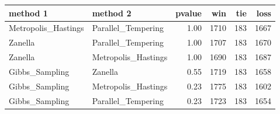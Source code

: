 \begin{table}[ht]
\centering
\begin{tabular}{llrrrr}
  \hline
method 1 & method 2 & pvalue & win & tie & loss \\ 
  \hline
Metropolis\_Hastings & Parallel\_Tempering & 1.00 & 1710 & 183 & 1667 \\ 
  Zanella & Parallel\_Tempering & 1.00 & 1707 & 183 & 1670 \\ 
  Zanella & Metropolis\_Hastings & 1.00 & 1690 & 183 & 1687 \\ 
  Gibbs\_Sampling & Zanella & 0.55 & 1719 & 183 & 1658 \\ 
  Gibbs\_Sampling & Metropolis\_Hastings & 0.23 & 1775 & 183 & 1602 \\ 
  Gibbs\_Sampling & Parallel\_Tempering & 0.23 & 1723 & 183 & 1654 \\ 
   \hline
\end{tabular}
\end{table}
